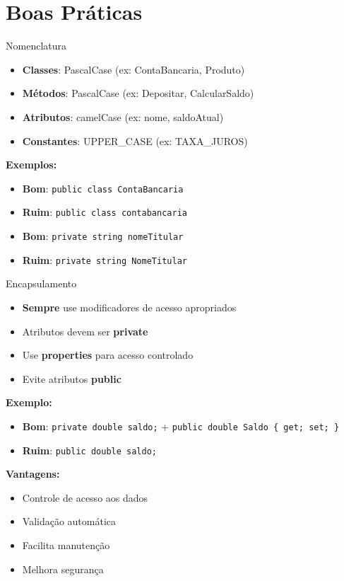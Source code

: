 \documentclass[aspectratio=169]{beamer}
\begin{document}
\section{Boas Práticas}

\begin{frame}{Nomenclatura}
\begin{itemize}
\item \textbf{Classes}: PascalCase (ex: ContaBancaria, Produto)
\item \textbf{Métodos}: PascalCase (ex: Depositar, CalcularSaldo)
\item \textbf{Atributos}: camelCase (ex: nome, saldoAtual)
\item \textbf{Constantes}: UPPER\_CASE (ex: TAXA\_JUROS)
\end{itemize}

\vspace{0.5cm}
\textbf{Exemplos:}
\begin{itemize}
\item \textbf{Bom}: \texttt{public class ContaBancaria}
\item \textbf{Ruim}: \texttt{public class contabancaria}
\item \textbf{Bom}: \texttt{private string nomeTitular}
\item \textbf{Ruim}: \texttt{private string NomeTitular}
\end{itemize}
\end{frame}

\begin{frame}{Encapsulamento}
\begin{itemize}
\item \textbf{Sempre} use modificadores de acesso apropriados
\item Atributos devem ser \textbf{private}
\item Use \textbf{properties} para acesso controlado
\item Evite atributos \textbf{public}
\end{itemize}

\vspace{0.5cm}
\textbf{Exemplo:}
\begin{itemize}
\item \textbf{Bom}: \texttt{private double saldo;} + \texttt{public double Saldo \{ get; set; \}}
\item \textbf{Ruim}: \texttt{public double saldo;}
\end{itemize}

\vspace{0.3cm}
\textbf{Vantagens:}
\begin{itemize}
\item Controle de acesso aos dados
\item Validação automática
\item Facilita manutenção
\item Melhora segurança
\end{itemize}
\end{frame}
\end{document}
